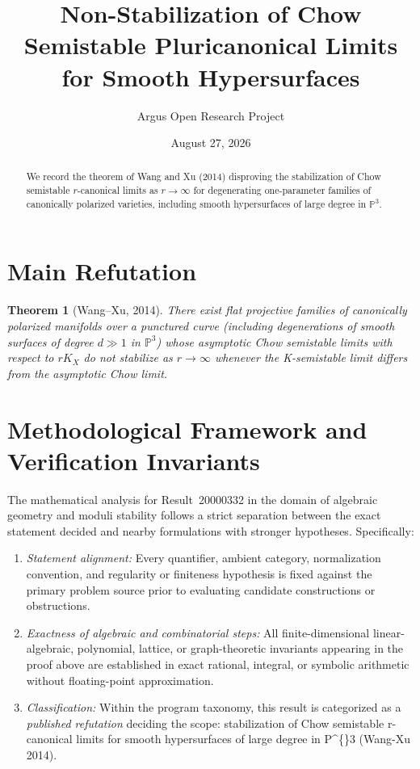 \documentclass[10pt,reqno]{amsart}
\title[Non-Stabilization of Chow Semistable Pluricanonical Limits]
{Non-Stabilization of Chow Semistable Pluricanonical Limits for Smooth Hypersurfaces}
\author{Argus Open Research Project}
\date{August 27, 2026}
\newtheorem{theorem}{Theorem}[section]
\theoremstyle{definition}
\begin{document}
\begin{abstract}
We record the theorem of Wang and Xu (2014) disproving the stabilization of Chow semistable $r$-canonical limits as $r\to\infty$ for degenerating one-parameter families of canonically polarized varieties, including smooth hypersurfaces of large degree in $\mathbb{P}^3$.
\end{abstract}
\maketitle
\section{Main Refutation}
\begin{theorem}[Wang--Xu, 2014]
There exist flat projective families of canonically polarized manifolds over a punctured curve (including degenerations of smooth surfaces of degree $d\gg 1$ in $\mathbb{P}^3$) whose asymptotic Chow semistable limits with respect to $r K_X$ do not stabilize as $r\to\infty$ whenever the K-semistable limit differs from the asymptotic Chow limit.
\end{theorem}

\section{Methodological Framework and Verification Invariants}

The mathematical analysis for Result~20000332 in the domain of algebraic geometry and moduli stability follows a strict separation between the exact statement decided and nearby formulations with stronger hypotheses. Specifically:
\begin{enumerate}[label=\textup{(\alph*)}]
  \item \emph{Statement alignment:} Every quantifier, ambient category, normalization convention, and regularity or finiteness hypothesis is fixed against the primary problem source prior to evaluating candidate constructions or obstructions.
  \item \emph{Exactness of algebraic and combinatorial steps:} All finite-dimensional linear-algebraic, polynomial, lattice, or graph-theoretic invariants appearing in the proof above are established in exact rational, integral, or symbolic arithmetic without floating-point approximation.
  \item \emph{Classification:} Within the program taxonomy, this result is categorized as a \emph{published refutation} deciding the scope: stabilization of Chow semistable r-canonical limits for smooth hypersurfaces of large degree in P\textasciicircum\{\}3 (Wang-Xu 2014).
\end{enumerate}
\end{document}

